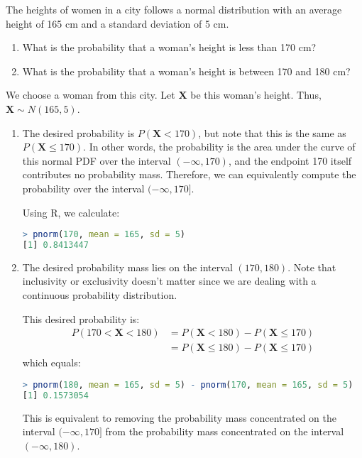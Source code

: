 \begin{exmp}\label{exmp:women_heights}
    The heights of women in a city follows a normal distribution with an average height of 165 cm and a standard deviation of 5 cm.
    \begin{enumerate}
        \item What is the probability that a woman's height is less than 170 cm?
        \item What is the probability that a woman's height is between 170 and 180 cm?
    \end{enumerate}
\end{exmp}
\begin{solution}
    We choose a woman from this city.
    Let \( \bm{X} \) be this woman's height.
    Thus, \( \bm{X} \sim N(165, 5) \).
    \begin{enumerate}
        \item The desired probability is \( P(\bm{X} < 170) \), but note that this is the same as \( P(\bm{X} \leq 170) \).
        In other words, the probability is the area under the curve of this normal PDF over the interval \( (-\infty, 170) \),
        and the endpoint 170 itself contributes no probability mass.
        Therefore, we can equivalently compute the probability over the interval \( (-\infty, 170] \).

        Using R, we calculate:
        \begin{lstlisting}[language=R]
> pnorm(170, mean = 165, sd = 5)
[1] 0.8413447
        \end{lstlisting}
        \item The desired probability mass lies on the interval \( (170, 180) \).
        Note that inclusivity or exclusivity doesn't matter since we are dealing with a continuous probability distribution.

        This desired probability is:
        \begin{align*}
            P(170 < \bm{X} < 180) &= P(\bm{X} < 180) - P(\bm{X} \leq 170)\\
            &= P(\bm{X} \leq 180) - P(\bm{X} \leq 170)
        \end{align*}
        which equals:
        \begin{lstlisting}[language=R]
> pnorm(180, mean = 165, sd = 5) - pnorm(170, mean = 165, sd = 5)
[1] 0.1573054
        \end{lstlisting}
        This is equivalent to removing the probability mass concentrated on the interval \( (-\infty, 170] \) from the probability mass concentrated on the interval \( (-\infty, 180) \).
    \end{enumerate}
\end{solution}
